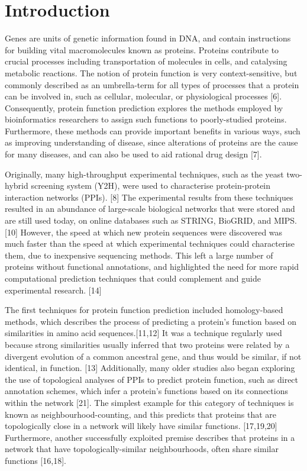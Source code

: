 \documentclass[9pt]{article}
\begin{document}
\section{Introduction}\label{sec:Introduction}
Genes are units of genetic information found in DNA, and contain instructions for building vital macromolecules known as proteins. Proteins contribute to crucial processes including transportation of molecules in cells, and catalysing metabolic reactions. The notion of protein function is very context-sensitive, but commonly described as an umbrella-term for all types of processes that a protein can be involved in, such as cellular, molecular, or physiological processes [6]. Consequently, protein function prediction explores the methods employed by bioinformatics researchers to assign such functions to poorly-studied proteins. Furthermore, these methods can provide important benefits in various ways, such as improving understanding of disease, since alterations of proteins are the cause for many diseases, and can also be used to aid rational drug design [7].
\par
Originally, many high-throughput experimental techniques, such as the yeast two-hybrid screening system (Y2H), were used to characterise protein-protein interaction networks (PPIs). [8] The experimental results from these techniques resulted in an abundance of large-scale biological networks that were stored and are still used today, on online databases such as STRING, BioGRID, and MIPS. [10] However, the speed at which new protein sequences were discovered was much faster than the speed at which experimental techniques could characterise them, due to inexpensive sequencing methods. This left a large number of proteins without functional annotations, and highlighted the need for more rapid computational prediction techniques that could complement and guide experimental research. [14]
\par
The first techniques for protein function prediction included homology-based methods, which describes the process of predicting a protein’s function based on similarities in amino acid sequences.[11,12] It was a technique regularly used because strong similarities usually inferred that two proteins were related by a divergent evolution of a common ancestral gene, and thus would be similar, if not identical, in function. [13] Additionally, many older studies also began exploring the use of topological analyses of PPIs to predict protein function, such as direct annotation schemes, which infer a protein’s functions based on its connections within the network [21]. The simplest example for this category of techniques is known as neighbourhood-counting, and this predicts that proteins that are topologically close in a network will likely have similar functions. [17,19,20] Furthermore, another successfully exploited premise describes that proteins in a network that have topologically-similar neighbourhoods, often share similar functions [16,18]. 
\end{document}
